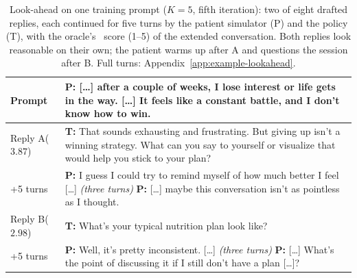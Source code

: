 \begin{table}[t]
\centering
\footnotesize
\setlength{\tabcolsep}{3pt}
\begin{tabular}{@{}p{}p{}@{}}
\toprule
Prompt & \textbf{P:} [\ldots] after a couple of weeks, I lose interest or life gets in the way.
[\ldots] It feels like a constant battle, and I don't know how to win.\\
\midrule
Reply A\newline ($3.87$) & \textbf{T:} That sounds exhausting and frustrating. But giving up isn't
a winning strategy. What can you say to yourself or visualize that would help you stick to your
plan?\\
+5 turns & \textbf{P:} I guess I could try to remind myself of how much better I feel [\ldots]
\emph{(three turns)} \textbf{P:} [\ldots] maybe this conversation isn't as pointless as I thought.\\
\midrule
Reply B\newline ($2.98$) & \textbf{T:} What's your typical nutrition plan look like?\\
+5 turns & \textbf{P:} Well, it's pretty inconsistent. [\ldots] \emph{(three turns)} \textbf{P:}
[\ldots] What's the point of discussing it if I still don't have a plan [\ldots]?\\
\bottomrule
\end{tabular}
\caption{Look-ahead on one training prompt ($K{=}5$, fifth iteration): two of eight drafted replies,
each continued for five turns by the patient simulator (P) and the policy (T), with the oracle's
\QQ\ score (1--5) of the extended conversation. Both replies look reasonable on their own; the
patient warms up after A and questions the session after B. Full turns:
Appendix~\ref{app:example-lookahead}.}
\label{tab:lookahead-example}
\end{table}

